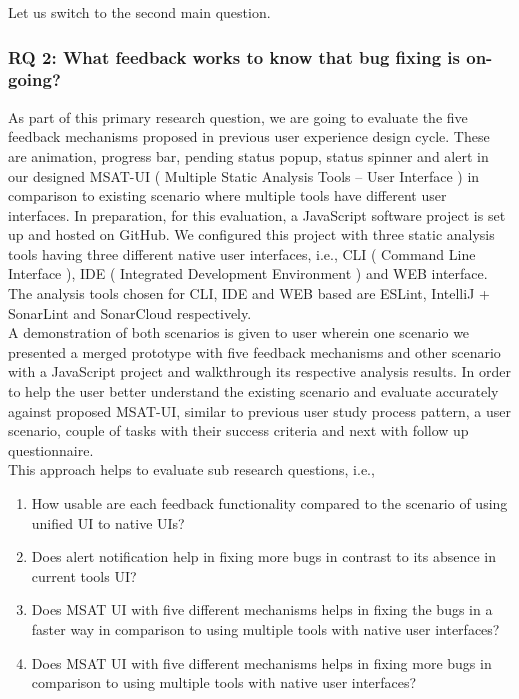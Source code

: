 Let us switch to the second main question.

\subsubsection{RQ 2: What feedback works to know that bug fixing is on-going?}

As part of this primary research question, we are going to evaluate the five feedback mechanisms proposed in previous user experience design cycle. These are animation, progress bar, pending status popup, status spinner and alert in our designed MSAT-UI ( Multiple Static Analysis Tools – User Interface ) in comparison to existing scenario where multiple tools have different user interfaces. In preparation, for this evaluation, a JavaScript software project is set up and hosted on GitHub. We configured this project with three static analysis tools having three different native user interfaces, i.e., CLI ( Command Line Interface ), IDE ( Integrated Development Environment ) and WEB interface. The analysis tools chosen for CLI, IDE and WEB based are ESLint, IntelliJ + SonarLint and SonarCloud respectively. \\

A demonstration of both scenarios is given to user wherein one scenario we presented a merged prototype with five feedback mechanisms and other scenario with a JavaScript project and walkthrough its respective analysis results. In order to help the user better understand the existing scenario and evaluate accurately against proposed MSAT-UI, similar to previous user study process pattern, a user scenario, couple of tasks with their success criteria and next with follow up questionnaire. \\

This approach helps to evaluate sub research questions, i.e., \\

\begin{enumerate}
\item How usable are each feedback functionality compared to the scenario of using unified UI to native UIs?
\item Does alert notification help in fixing more bugs in contrast to its absence in current tools UI?
\item Does MSAT UI with five different mechanisms helps in fixing the bugs in a faster way in comparison to using multiple tools with native user interfaces?
\item Does MSAT UI with five different mechanisms helps in fixing more bugs in comparison to using multiple tools with native user interfaces?
\end{enumerate}

